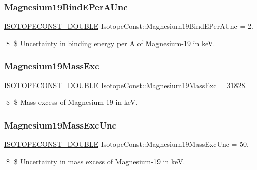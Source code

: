 \subsubsection{\texorpdfstring{Magnesium19\+Bind\+E\+Per\+A\+Unc}{Magnesium19BindEPerAUnc}}
{\footnotesize\ttfamily \mbox{\hyperlink{group___isotope_const-_macros_ga8f45a7272ce02c0b4c65c44636ed719a}{I\+S\+O\+T\+O\+P\+E\+C\+O\+N\+S\+T\+\_\+\+D\+O\+U\+B\+LE}} Isotope\+Const\+::\+Magnesium19\+Bind\+E\+Per\+A\+Unc = 2.}

\$ \$ Uncertainty in binding energy per A of Magnesium-\/19 in keV. \mbox{\label{group___isotope_const-_magnesium-_mg19_ga7346863b9513fda514ed6c1911b5ac62}} 
\subsubsection{\texorpdfstring{Magnesium19\+Mass\+Exc}{Magnesium19MassExc}}
{\footnotesize\ttfamily \mbox{\hyperlink{group___isotope_const-_macros_ga8f45a7272ce02c0b4c65c44636ed719a}{I\+S\+O\+T\+O\+P\+E\+C\+O\+N\+S\+T\+\_\+\+D\+O\+U\+B\+LE}} Isotope\+Const\+::\+Magnesium19\+Mass\+Exc = 31828.}

\$ \$ Mass excess of Magnesium-\/19 in keV. \mbox{\label{group___isotope_const-_magnesium-_mg19_gad79113e71ebc91260a7a4d16d29379fe}} 
\subsubsection{\texorpdfstring{Magnesium19\+Mass\+Exc\+Unc}{Magnesium19MassExcUnc}}
{\footnotesize\ttfamily \mbox{\hyperlink{group___isotope_const-_macros_ga8f45a7272ce02c0b4c65c44636ed719a}{I\+S\+O\+T\+O\+P\+E\+C\+O\+N\+S\+T\+\_\+\+D\+O\+U\+B\+LE}} Isotope\+Const\+::\+Magnesium19\+Mass\+Exc\+Unc = 50.}

\$ \$ Uncertainty in mass excess of Magnesium-\/19 in keV. \mbox{\label{group___isotope_const-_magnesium-_mg19_ga1106b3cf5aa0cb0bdffdd55232d357ae}} 
